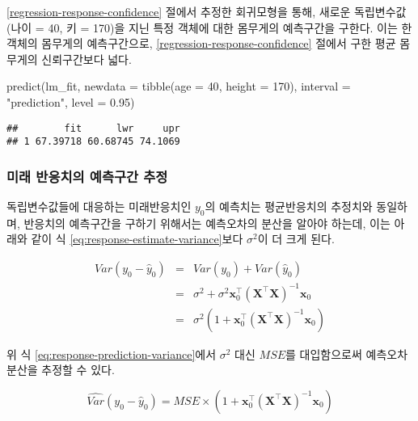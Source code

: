 \documentclass[
]{book}
\newenvironment{Shaded}{\begin{snugshade}}{\end{snugshade}}
\newcommand{\AttributeTok}[1]{\textcolor[rgb]{0.77,0.63,0.00}{#1}}
\newcommand{\DecValTok}[1]{\textcolor[rgb]{0.00,0.00,0.81}{#1}}
\newcommand{\FloatTok}[1]{\textcolor[rgb]{0.00,0.00,0.81}{#1}}
\newcommand{\FunctionTok}[1]{\textcolor[rgb]{0.00,0.00,0.00}{#1}}
\newcommand{\NormalTok}[1]{#1}
\newcommand{\StringTok}[1]{\textcolor[rgb]{0.31,0.60,0.02}{#1}}
\begin{document}
\ref{regression-response-confidence} 절에서 추정한 회귀모형을 통해, 새로운 독립변수값(나이 = 40, 키 = 170)을 지닌 특정 객체에 대한 몸무게의 예측구간을 구한다. 이는 한 객체의 몸무게의 예측구간으로, \ref{regression-response-confidence} 절에서 구한 평균 몸무게의 신뢰구간보다 넓다.

\begin{Shaded}
\begin{Highlighting}[]
\FunctionTok{predict}\NormalTok{(lm\_fit, }\AttributeTok{newdata =} \FunctionTok{tibble}\NormalTok{(}\AttributeTok{age =} \DecValTok{40}\NormalTok{, }\AttributeTok{height =} \DecValTok{170}\NormalTok{),}
        \AttributeTok{interval =} \StringTok{"prediction"}\NormalTok{, }\AttributeTok{level =} \FloatTok{0.95}\NormalTok{)}
\end{Highlighting}
\end{Shaded}

\begin{verbatim}
##        fit      lwr     upr
## 1 67.39718 60.68745 74.1069
\end{verbatim}

\hypertarget{regression-response-prediction-interval}{%
\subsubsection{미래 반응치의 예측구간 추정}\label{regression-response-prediction-interval}}

독립변수값들에 대응하는 미래반응치인 \(y_0\)의 예측치는 평균반응치의 추정치와 동일하며, 반응치의 예측구간을 구하기 위해서는 예측오차의 분산을 알아야 하는데, 이는 아래와 같이 식 \eqref{eq:response-estimate-variance}보다 \(\sigma^2\)이 더 크게 된다.

\begin{eqnarray}
Var(y_0 - \hat{y}_0) &=& Var(y_0) + Var(\hat{y}_0)\\
&=& \sigma^2 + \sigma^2 \mathbf{x}_0^\top \left(\mathbf{X}^\top \mathbf{X}\right)^{-1} \mathbf{x}_0 \\
&=& \sigma^2 \left( 1 + \mathbf{x}_0^\top \left(\mathbf{X}^\top \mathbf{X}\right)^{-1} \mathbf{x}_0 \right)
\label{eq:response-prediction-variance}
\end{eqnarray}

위 식 \eqref{eq:response-prediction-variance}에서 \(\sigma^2\) 대신 \(MSE\)를 대입함으로써 예측오차 분산을 추정할 수 있다.

\begin{equation}
\hat{Var}(y_0 - \hat{y}_0) = MSE \times \left( 1 + \mathbf{x}_0^\top \left(\mathbf{X}^\top \mathbf{X}\right)^{-1} \mathbf{x}_0 \right)
\label{eq:response-prediction-variance-est}
\end{equation}
\end{document}
